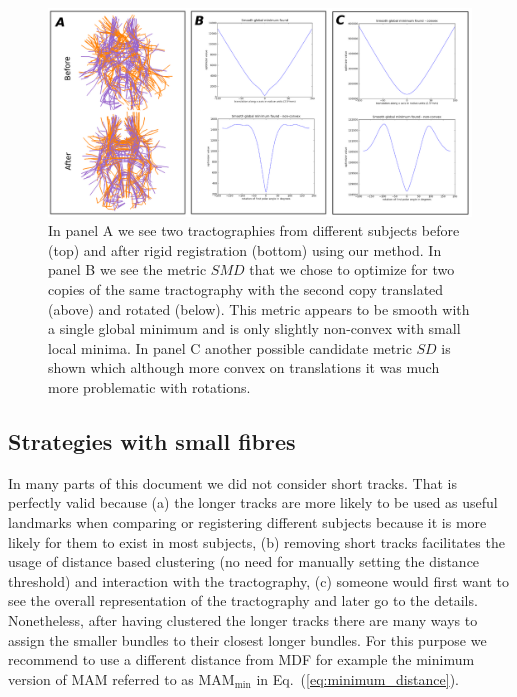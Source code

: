 \documentclass[preprint,authoryear,a4paper,10pt,onecolumn]{elsarticle}
\begin{document}
%
\begin{figure}
\begin{centering}
\includegraphics[scale=0.8]{last_figures/LSC_registration2}
\par\end{centering}
\caption{In panel A we see two tractographies from different subjects
  before (top) and after rigid registration (bottom) using our
  method. In panel B we see the metric $SMD$ that we chose to optimize
  for two copies of the same tractography with the second copy
  translated (above) and rotated (below). This metric appears to be
  smooth with a single global minimum and is only slightly non-convex
  with small local minima. In panel C another possible candidate metric
  $SD$ is shown which although more convex on translations it was much
  more problematic with rotations.\label{Flo:direct_registration}}
\end{figure}

\subsection{Strategies with small fibres}

In many parts of this document we did not consider short tracks. That
is perfectly valid because (a) the longer tracks are more likely to
be used as useful landmarks when comparing or registering different
subjects because it is more likely for them to exist in most subjects,
(b) removing short tracks facilitates the usage of distance based
clustering (no need for manually setting the distance threshold) and
interaction with the tractography, (c) someone would first want to
see the overall representation of the tractography and later go to
the details. Nonetheless, after having clustered the longer tracks
there are many ways to assign the smaller bundles to their closest
longer bundles. For this purpose we recommend to use a different distance
from MDF for example the minimum version of MAM referred
to as $\textrm{MAM}_{\textrm{min}}$ in Eq.~(\ref{eq:minimum_distance}). 
\end{document}
